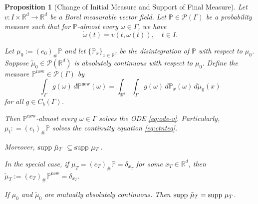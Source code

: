 \documentclass{article}
\newtheorem{proposition}[theorem]{Proposition}
\newcommand{\Rd}{\mathbb{R}^d}
\begin{document}
\begin{proposition}[Change of Initial Measure and Support of Final Measure]
\label{prop:change-initial}
Let $v: I \times \mathbb{R}^d \rightarrow \mathbb{R}^d$ be a Borel measurable vector field. Let $\mathbb{P} \in \mathcal{P}(\Gamma)$ be a probability measure such that for $\mathbb{P}$-almost every $\omega \in \Gamma$, we have
\begin{equation}
\label{eq:ode-v}
\dot{\omega}(t) = v(t,\omega(t)), \quad t \in I.
\end{equation}

Let $\mu_0 := (e_0)_{\#}\mathbb{P}$ and let $\{\mathbb{P}_x\}_{x \in \mathbb{R}^d}$ be the disintegration of $\mathbb{P}$ with respect to $\mu_0$. Suppose $\tilde{\mu}_0 \in \mathcal{P}(\mathbb{R}^d)$ is absolutely continuous with respect to $\mu_0$. Define the measure $\mathbb{P}^{\mathrm{new}} \in \mathcal{P}(\Gamma)$ by
\[\int_{\Gamma} g(\omega) \, d\mathbb{P}^{\mathrm{new}}(\omega) = \int_{\mathbb{R}^d} \int_{\Gamma} g(\omega) \, d\mathbb{P}_x(\omega) \, d\tilde{\mu}_0(x)\]
for all $g \in C_b(\Gamma)$.

Then $\mathbb{P}^{\mathrm{new}}$-almost every $\omega \in \Gamma$ solves the ODE \eqref{eq:ode-v}. Particularly, $\mu_t : = (e_t)_{\#}\mathbb{P}$ solves the continuity equation \eqref{eq:ctnteq}.



Moreover, ${\rm supp} ~\tilde{\mu}_T ~ \subseteq {\rm supp} ~ \mu_T$.

In the special case, if $\mu_T  = (e_T)_{\#}\mathbb{P} = \delta_{x_T}$ for some $x_T \in \mathbb{R}^d$, then $\tilde{\mu}_T := (e_T)_{\#}\mathbb{P}^{\mathrm{new}} = \delta_{x_T}$. 

If $\mu_0$ and $\tilde{\mu}_0$ are mutually absolutely continuous. Then  ${\rm supp} ~\tilde{\mu}_T  = {\rm supp} ~ \mu_T$.
\end{proposition}
\end{document}
